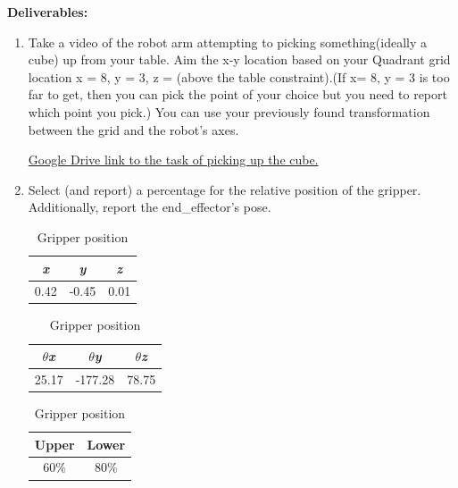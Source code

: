 \documentclass[12pt]{article}
\begin{document}
\textbf{Deliverables:}
\begin{enumerate}
    \item Take a video of the robot arm attempting to picking something(ideally a cube) up from your table. Aim the x-y location based on your Quadrant grid location x = 8, y = 3, z = (above the table constraint).(If x= 8, y = 3 is too far to get, then you can pick the point of your choice but you need to report which point you pick.) You can use your previously found transformation between the grid and the robot’s axes.
    
    \href{https://drive.google.com/file/d/1D1Jmkw2CXvhRt7frQ14ccnZXA-bbWVx6/view?usp=share_link}{Google Drive link to the task of picking up the cube.}
        
    \item Select (and report) a percentage for the relative position of the gripper. Additionally, report the end\_effector’s pose. 

    \begin{table}[H]
        \caption{Pose information of end effector in pickup state}
        \begin{subtable}{.3\linewidth}
            \centering
            \caption{End effector position}
            \begin{tabular}{ccc}
                \toprule
                \textit{x} & \textit{y} & \textit{z} \\\midrule
                0.42 & -0.45 & 0.01 \\\bottomrule
            \end{tabular}
        \end{subtable}
        \hfill
        \begin{subtable}{.4\linewidth}
            \centering
            \caption{End effector orientation}
            \begin{tabular}{ccc}
                \toprule
                \textit{$\theta$x} & \textit{$\theta$y} & \textit{$\theta$z} \\\midrule
                25.17 & -177.28 & 78.75 \\\bottomrule
            \end{tabular}
        \end{subtable}
        \hfill
        \begin{subtable}{.25\linewidth}
            \centering
            \caption{Gripper position}
            \begin{tabular}{cc}
                \toprule
                Upper & Lower \\\midrule
                60\% & 80\% \\\bottomrule
            \end{tabular}
        \end{subtable}
    \end{table}

\end{enumerate}
\end{document}
